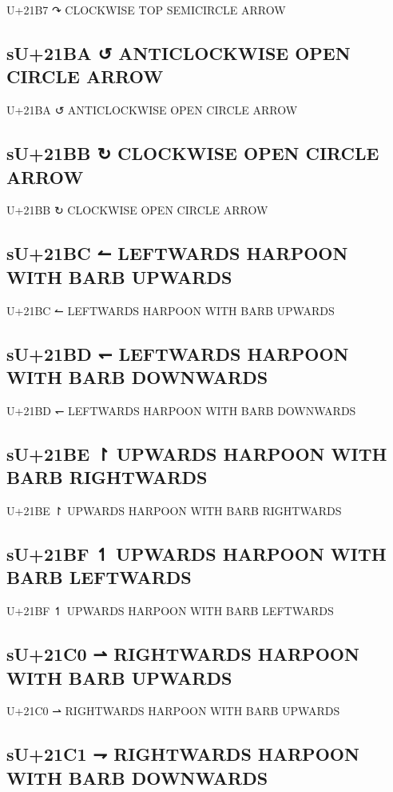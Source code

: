 U+21B7 ↷ CLOCKWISE TOP SEMICIRCLE ARROW

\subsection{sU+21BA ↺ ANTICLOCKWISE OPEN CIRCLE ARROW}

U+21BA ↺ ANTICLOCKWISE OPEN CIRCLE ARROW

\subsection{sU+21BB ↻ CLOCKWISE OPEN CIRCLE ARROW}

U+21BB ↻ CLOCKWISE OPEN CIRCLE ARROW

\subsection{sU+21BC ↼ LEFTWARDS HARPOON WITH BARB UPWARDS}

U+21BC ↼ LEFTWARDS HARPOON WITH BARB UPWARDS

\subsection{sU+21BD ↽ LEFTWARDS HARPOON WITH BARB DOWNWARDS}

U+21BD ↽ LEFTWARDS HARPOON WITH BARB DOWNWARDS

\subsection{sU+21BE ↾ UPWARDS HARPOON WITH BARB RIGHTWARDS}

U+21BE ↾ UPWARDS HARPOON WITH BARB RIGHTWARDS

\subsection{sU+21BF ↿ UPWARDS HARPOON WITH BARB LEFTWARDS}

U+21BF ↿ UPWARDS HARPOON WITH BARB LEFTWARDS

\subsection{sU+21C0 ⇀ RIGHTWARDS HARPOON WITH BARB UPWARDS}

U+21C0 ⇀ RIGHTWARDS HARPOON WITH BARB UPWARDS

\subsection{sU+21C1 ⇁ RIGHTWARDS HARPOON WITH BARB DOWNWARDS}

